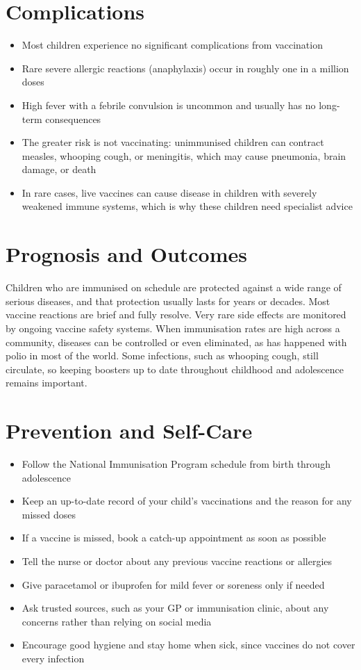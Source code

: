 \section*{Complications}
\begin{itemize}
    \item Most children experience no significant complications from vaccination
    \item Rare severe allergic reactions (anaphylaxis) occur in roughly one in a million doses
    \item High fever with a febrile convulsion is uncommon and usually has no long-term consequences
    \item The greater risk is not vaccinating: unimmunised children can contract measles, whooping cough, or meningitis, which may cause pneumonia, brain damage, or death
    \item In rare cases, live vaccines can cause disease in children with severely weakened immune systems, which is why these children need specialist advice
\end{itemize}

\section*{Prognosis and Outcomes}
Children who are immunised on schedule are protected against a wide range of serious diseases, and that protection usually lasts for years or decades. Most vaccine reactions are brief and fully resolve. Very rare side effects are monitored by ongoing vaccine safety systems. When immunisation rates are high across a community, diseases can be controlled or even eliminated, as has happened with polio in most of the world. Some infections, such as whooping cough, still circulate, so keeping boosters up to date throughout childhood and adolescence remains important.

\section*{Prevention and Self-Care}
\begin{itemize}
    \item Follow the National Immunisation Program schedule from birth through adolescence
    \item Keep an up-to-date record of your child's vaccinations and the reason for any missed doses
    \item If a vaccine is missed, book a catch-up appointment as soon as possible
    \item Tell the nurse or doctor about any previous vaccine reactions or allergies
    \item Give paracetamol or ibuprofen for mild fever or soreness only if needed
    \item Ask trusted sources, such as your GP or immunisation clinic, about any concerns rather than relying on social media
    \item Encourage good hygiene and stay home when sick, since vaccines do not cover every infection
\end{itemize}

